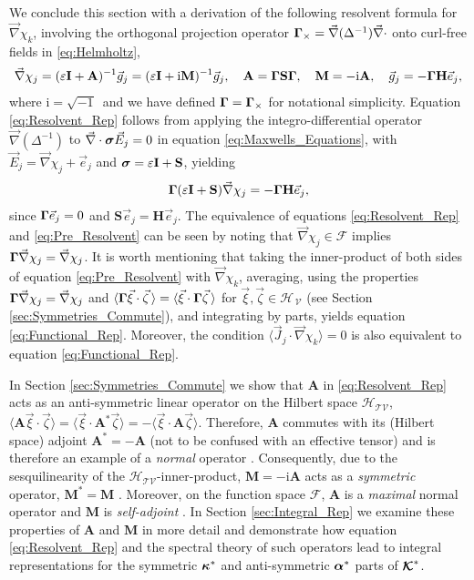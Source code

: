\documentclass[11pt]{amsart}
\newcommand{\I}{\mathrm{i}}
\newcommand{\Mb}{\mathbf{M}}
\newcommand{\Hb}{\mathbf{H}}
\newcommand{\Ib}{\mathbf{I}}
\newcommand{\Sb}{\mathbf{S}}
\newcommand{\Ab}{\mathbf{A}}
\newcommand\Kbc{\mbox{\boldmath${\mathcal{K}}$}}
\newcommand{\Tc}{\mathcal{T}}
\newcommand{\Vc}{\mathcal{V}}
\newcommand{\Hs}{\mathscr{H}}
\newcommand{\Fs}{\mathscr{F}}
\newcommand\bsig{\mbox{\boldmath${\sigma}$}}
\newcommand\balpha{\mbox{\boldmath${\alpha}$}}
\newcommand\bkappa{\mbox{\boldmath${\kappa}$}}
\newcommand\bGamma{\mbox{\boldmath${\Gamma}$}}
\begin{document}
We conclude this section with a derivation of the following resolvent
formula for $\vec{\nabla}\chi_k$, involving the orthogonal projection
operator $\bGamma_\times=\vec{\nabla}(\Delta^{-1})\vec{\nabla}\cdot$ onto curl-free fields in
\eqref{eq:Helmholtz},  
\begin{align}\label{eq:Resolvent_Rep}
  \vec{\nabla}\chi_j=(\varepsilon\Ib+\Ab)^{-1}\vec{g}_j
           =(\varepsilon\Ib+\I\Mb)^{-1}\vec{g}_j, \quad
  \Ab=\bGamma\Sb\bGamma, \quad
  \Mb=-\I\Ab, \quad
  \vec{g}_j=-\bGamma\Hb\vec{e}_j,
\end{align}
%
where $\I=\sqrt{-1}\,$ and we have defined $\bGamma=\bGamma_\times$ for
notational simplicity. Equation \eqref{eq:Resolvent_Rep} follows from
applying the integro-differential operator $\vec{\nabla}(\Delta^{-1})$ to
$\vec{\nabla}\cdot\bsig\vec{E}_j=0$ in equation \eqref{eq:Maxwells_Equations},
with $\vec{E}_j=\vec{\nabla}\chi_j+\vec{e}_j$ and $\bsig=\varepsilon\Ib+\Sb$, yielding  
%
\begin{align}\label{eq:Pre_Resolvent}
  \bGamma(\varepsilon\Ib+\Sb)\vec{\nabla}\chi_j=-\bGamma\Hb\vec{e}_j,
\end{align}
%
since $\bGamma\vec{e}_j=0$ and $\Sb\vec{e}_j=\Hb\vec{e}_j$.
The equivalence of equations \eqref{eq:Resolvent_Rep} and
\eqref{eq:Pre_Resolvent} can be seen by noting that
$\vec{\nabla}\chi_j\in\Fs$ implies $\bGamma\vec{\nabla}\chi_j=\vec{\nabla}\chi_j$. It is worth
mentioning that taking the inner-product of both sides of equation
\eqref{eq:Pre_Resolvent} with $\vec{\nabla}\chi_k$, averaging, using the
properties $\bGamma\vec{\nabla}\chi_j=\vec{\nabla}\chi_j$ and
$\langle\bGamma\vec{\xi}\cdot\vec{\zeta}\,\rangle=\langle\vec{\xi}\cdot\bGamma\vec{\zeta}\,\rangle$ for
$\vec{\xi},\vec{\zeta}\in\Hs_{\,\Vc}$ (see Section
\ref{sec:Symmetries_Commute}), and integrating by parts, yields
equation  \eqref{eq:Functional_Rep}. Moreover, the condition
$\langle\vec{J}_j\cdot\vec{\nabla}\chi_k\rangle=0$ is also equivalent to equation
\eqref{eq:Functional_Rep}.  



In Section \ref{sec:Symmetries_Commute} we show that $\Ab$ in
\eqref{eq:Resolvent_Rep} acts as an anti-symmetric linear operator on
the Hilbert space $\Hs_{\Tc\Vc}$,
$\langle\Ab\vec{\xi}\cdot\vec{\zeta}\rangle=\langle\vec{\xi}\cdot\Ab^*\vec{\zeta}\rangle=-\langle\vec{\xi}\cdot\Ab\vec{\zeta}\rangle$. Therefore,
$\Ab$ commutes with its (Hilbert space) adjoint $\Ab^*=-\Ab$ (not to
be confused with an effective tensor) and is therefore an example of a
\emph{normal} operator \cite{Stone:64}. Consequently, due to the
sesquilinearity of the $\Hs_{\Tc\Vc}$-inner-product, $\Mb=-\I\Ab$ acts
as a \emph{symmetric} operator, $\Mb^*=\Mb$
\cite{Reed-1980,Stone:64}. Moreover, on the function space $\Fs$,
$\Ab$ is a \emph{maximal} normal operator and $\Mb$ is
\emph{self-adjoint} \cite{Stone:64}. In Section \ref{sec:Integral_Rep}
we examine these properties of $\Ab$ and $\Mb$ in more detail and
demonstrate how equation \eqref{eq:Resolvent_Rep} and the spectral
theory of such operators lead to integral representations for the
symmetric $\bkappa^*$ and anti-symmetric $\balpha^*$ parts of $\Kbc^*$.      
\end{document}
